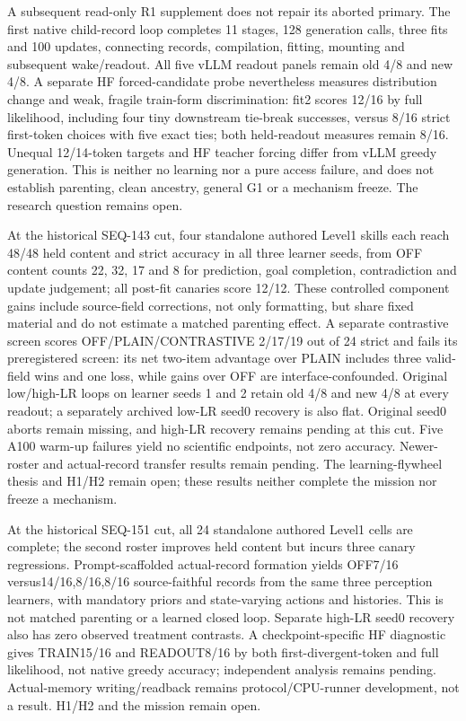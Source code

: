 \documentclass{article}
\begin{document}
A subsequent read-only R1 supplement does not repair its aborted primary.
The first native child-record loop completes 11 stages, 128 generation calls,
three fits and 100 updates, connecting records, compilation, fitting, mounting
and subsequent wake/readout. All five vLLM readout panels remain old 4/8 and
new 4/8. A separate HF forced-candidate probe nevertheless measures distribution
change and weak, fragile train-form discrimination: fit2 scores 12/16 by full
likelihood, including four tiny downstream tie-break successes, versus 8/16
strict first-token choices with five exact ties; both held-readout measures
remain 8/16. Unequal 12/14-token targets and HF teacher forcing differ from
vLLM greedy generation. This is neither no learning nor a pure access failure,
and does not establish parenting, clean ancestry, general G1 or a mechanism
freeze. The research question remains open.

At the historical SEQ-143 cut, four standalone authored Level1 skills each reach 48/48 held
content and strict accuracy in all three learner seeds, from OFF content counts
22, 32, 17 and 8 for prediction, goal completion, contradiction and update
judgement; all post-fit canaries score 12/12. These controlled component gains
include source-field corrections, not only formatting, but share fixed material
and do not estimate a matched parenting effect. A separate contrastive screen
scores OFF/PLAIN/CONTRASTIVE 2/17/19 out of 24 strict and fails its preregistered
screen: its net two-item advantage over PLAIN includes three valid-field wins
and one loss, while gains over OFF are interface-confounded. Original low/high-LR
loops on learner seeds 1 and 2 retain old 4/8 and new 4/8 at every readout;
a separately archived low-LR seed0 recovery is also flat. Original seed0 aborts
remain missing, and high-LR recovery remains pending at this cut. Five A100
warm-up failures yield no scientific endpoints, not zero accuracy. Newer-roster
and actual-record transfer results remain pending. The learning-flywheel thesis
and H1/H2 remain open; these results neither complete the mission nor freeze a
mechanism.

At the historical SEQ-151 cut, all 24 standalone authored Level1 cells are complete;
the second roster improves held content but incurs three canary regressions.
Prompt-scaffolded actual-record formation yields OFF7/16 versus14/16,8/16,8/16
source-faithful records from the same three perception learners, with mandatory
priors and state-varying actions and histories. This is not matched parenting or
a learned closed loop. Separate high-LR seed0 recovery also has zero observed
treatment contrasts. A checkpoint-specific HF diagnostic gives TRAIN15/16 and
READOUT8/16 by both first-divergent-token and full likelihood, not native greedy accuracy;
independent analysis remains pending. Actual-memory writing/readback remains
protocol/CPU-runner development, not a result. H1/H2 and the mission remain open.
\end{document}
